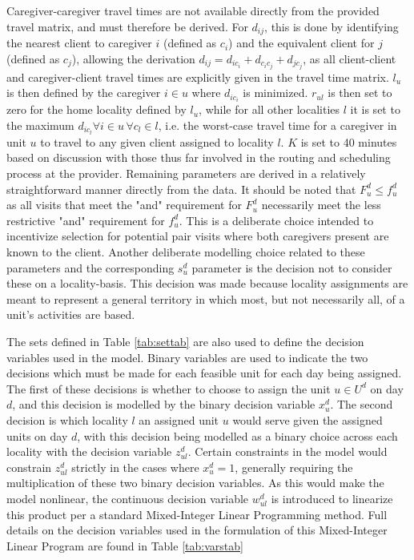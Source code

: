 \documentclass[11pt,twoside]{article}
\numberwithin{Theorem}{section}
\numberwithin{Definition}{section}
\numberwithin{Lemma}{section}
\numberwithin{Algorithm}{section}
\numberwithin{equation}{section}
\begin{document}
Caregiver-caregiver travel times are not available directly from the provided travel matrix, and must therefore be derived. For $d_{ij}$, this is done by identifying the nearest client to caregiver $i$ (defined as $c_i$) and the equivalent client for $j$ (defined as $c_j$), allowing the derivation $d_{ij} = d_{i c_i} + d_{c_i c_j} + d_{j c_j}$, as all client-client and caregiver-client travel times are explicitly given in the travel time matrix. $l_u$ is then defined by the caregiver $i \in u$ where $d_{i c_i}$ is minimized. $r_{ul}$ is then set to zero for the home locality defined by $l_u$, while for all other localities $l$ it is set to the maximum $d_{i c_l} \forall i \in u \, \forall c_l \in l$, i.e. the worst-case travel time for a caregiver in unit $u$ to travel to any given client assigned to locality $l$. $K$ is set to 40 minutes based on discussion with those thus far involved in the routing and scheduling process at the provider. Remaining parameters are derived in a relatively straightforward manner directly from the data. It should be noted that $F_u^d \leq f_u^d$ as all visits that meet the "and" requirement for $F_u^d$ necessarily meet the less restrictive "and" requirement for $f_u^d$. This is a deliberate choice intended to incentivize selection for potential pair visits where both caregivers present are known to the client. Another deliberate modelling choice related to these parameters and the corresponding $s_u^d$ parameter is the decision not to consider these on a locality-basis. This decision was made because locality assignments are meant to represent a general territory in which most, but not necessarily all, of a unit's activities are based.

The sets defined in Table \ref{tab:settab} are also used to define the decision variables used in the model. Binary variables are used to indicate the two decisions which must be made for each feasible unit for each day being assigned. The first of these decisions is whether to choose to assign the unit $u \in U^d$ on day $d$, and this decision is modelled by the binary decision variable $x_u^d$. The second decision is which locality $l$ an assigned unit $u$ would serve given the assigned units on day $d$, with this decision being modelled as a binary choice across each locality with the decision variable $z_{ul}^d$. Certain constraints in the model would constrain $z_{ul}^d$ strictly in the cases where $x_u^d = 1$, generally requiring the multiplication of these two binary decision variables. As this would make the model nonlinear, the continuous decision variable $w_{ul}^d$ is introduced to linearize this product per a standard Mixed-Integer Linear Programming method. Full details on the decision variables used in the formulation of this Mixed-Integer Linear Program are found in Table \ref{tab:varstab}
\end{document}
